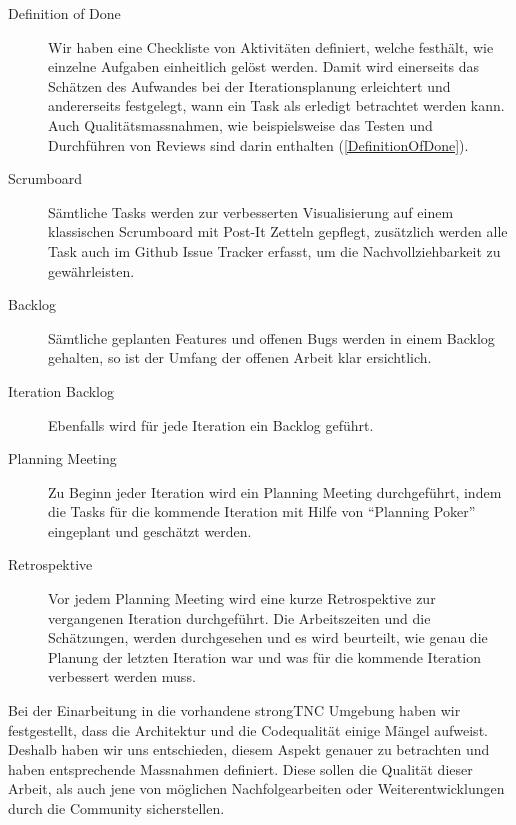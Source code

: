 \begin{description}
	\item[Definition of Done] Wir haben eine Checkliste von Aktivitäten	definiert,
	welche festhält, wie einzelne Aufgaben einheitlich gelöst werden. Damit wird
	einerseits das Schätzen des Aufwandes bei der Iterationsplanung erleichtert und
	andererseits festgelegt, wann ein Task als erledigt betrachtet werden kann.
	Auch Qualitätsmassnahmen, wie beispielsweise das Testen und Durchführen von
	Reviews sind darin enthalten (\autoref{DefinitionOfDone}).

	\item[Scrumboard] Sämtliche Tasks werden zur verbesserten Visualisierung auf
	einem klassischen Scrumboard mit Post-It Zetteln gepflegt, zusätzlich werden
	alle Task auch im Github Issue Tracker erfasst, um die Nachvollziehbarkeit
	zu gewährleisten.
	
	\item[Backlog] Sämtliche geplanten Features und offenen Bugs werden in einem
	Backlog gehalten, so ist der Umfang der offenen Arbeit klar ersichtlich.
	
	\item[Iteration Backlog] Ebenfalls wird für jede Iteration ein Backlog
	geführt.
	
	\item[Planning Meeting] Zu Beginn jeder Iteration wird ein Planning Meeting
	durchgeführt, indem die Tasks für die kommende Iteration mit Hilfe von
	\enquote{Planning Poker} eingeplant und geschätzt werden.
		
	\item[Retrospektive] Vor jedem Planning Meeting wird eine kurze Retrospektive
	zur vergangenen Iteration durchgeführt. Die Arbeitszeiten und die Schätzungen,
	werden durchgesehen und es wird beurteilt, wie genau die Planung der letzten
	Iteration war und was für die kommende Iteration verbessert werden muss.
	
\end{description}

Bei der Einarbeitung in die vorhandene strongTNC Umgebung haben wir
festgestellt, dass die Architektur und die Codequalität einige Mängel aufweist.
Deshalb haben wir uns entschieden, diesem Aspekt genauer zu betrachten
und haben entsprechende Massnahmen definiert. Diese sollen die Qualität dieser
Arbeit, als auch jene von möglichen Nachfolgearbeiten oder Weiterentwicklungen
durch die Community sicherstellen.

